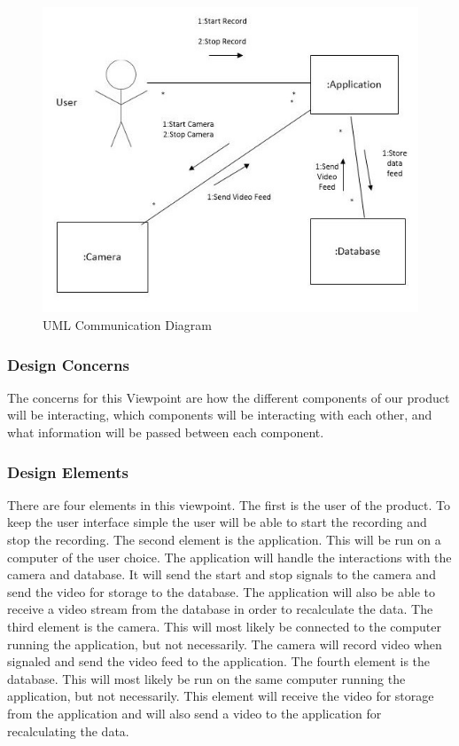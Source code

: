 \documentclass[letterpaper,10pt,onecolumn,draftclsnofoot]{IEEEtran}
\begin{document}
\begin{figure}[H]
\includegraphics[scale=.7]{interaction_diagram}
\caption{UML Communication Diagram}
\label{inter}
\end{figure}


\subsubsection{Design Concerns}

The concerns for this Viewpoint are how the different components of our product will be interacting, which components will be interacting with each other, and what information will be passed between each component.

\subsubsection{Design Elements}

There are four elements in this viewpoint.
The first is the user of the product.
To keep the user interface simple the user will be able to start the recording and stop the recording.
The second element is the application.
This will be run on a computer of the user choice.
The application will handle the interactions with the camera and database.
It will send the start and stop signals to the camera and send the video for storage to the database.
The application will also be able to receive a video stream from the database in order to recalculate the data.
The third element is the camera.
This will most likely be connected to the computer running the application, but not necessarily. The camera will record video when signaled and send the video feed to the application.
The fourth element is the database.
This will most likely be run on the same computer running the application, but not necessarily.
This element will receive the video for storage from the application and will also send a video to the application for recalculating the data.
\end{document}
